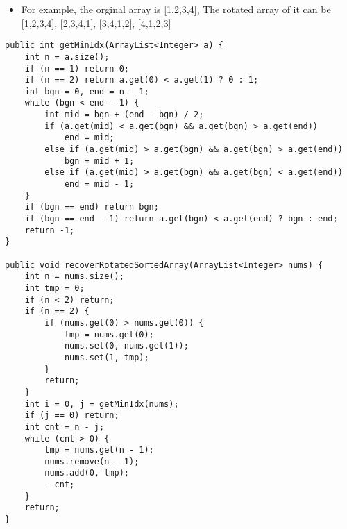 \documentclass[12pt]{book}
\begin{document}
\begin{itemize}
\item For example, the orginal array is [1,2,3,4], The rotated array of it can be [1,2,3,4], [2,3,4,1], [3,4,1,2], [4,1,2,3]
\end{itemize}
\lstset{language=java,label= ,caption= ,numbers=none}
\begin{lstlisting}
public int getMinIdx(ArrayList<Integer> a) {
    int n = a.size();
    if (n == 1) return 0;
    if (n == 2) return a.get(0) < a.get(1) ? 0 : 1;
    int bgn = 0, end = n - 1;
    while (bgn < end - 1) {
        int mid = bgn + (end - bgn) / 2;
        if (a.get(mid) < a.get(bgn) && a.get(bgn) > a.get(end))
            end = mid;
        else if (a.get(mid) > a.get(bgn) && a.get(bgn) > a.get(end))
            bgn = mid + 1;
        else if (a.get(mid) > a.get(bgn) && a.get(bgn) < a.get(end))
            end = mid - 1;
    }
    if (bgn == end) return bgn;
    if (bgn == end - 1) return a.get(bgn) < a.get(end) ? bgn : end;
    return -1;
}

public void recoverRotatedSortedArray(ArrayList<Integer> nums) {
    int n = nums.size();
    int tmp = 0;
    if (n < 2) return;
    if (n == 2) {
        if (nums.get(0) > nums.get(0)) {
            tmp = nums.get(0);
            nums.set(0, nums.get(1));
            nums.set(1, tmp);
        }
        return;
    }
    int i = 0, j = getMinIdx(nums);
    if (j == 0) return;
    int cnt = n - j;
    while (cnt > 0) {
        tmp = nums.get(n - 1);
        nums.remove(n - 1);
        nums.add(0, tmp);
        --cnt;
    }
    return;
}
\end{lstlisting}
\chapter{}
\label{sec-49}
\end{document}
